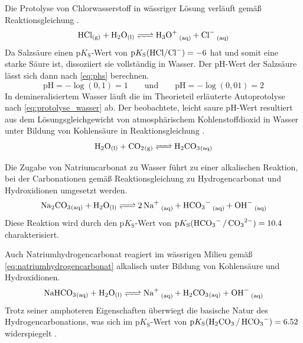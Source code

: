 Die Protolyse von Chlorwasserstoff in wässriger Lösung verläuft gemäß Reaktionsgleichung .
\begin{equation}
    \ce{HCl_{(g)} + H2O_{(l)} <=> H3O+ _{(aq)} + Cl- _{(aq)}}
    \label{eq:hcl_protolyse}
\end{equation}
Da Salzsäure einen  $\mathrm{p}K_{\mathrm{S}}$-Wert von $\mathrm{p}K_{\mathrm{S}}\mathrm{\ce{(HCl/Cl^-)}}=-6$ hat und somit eine starke Säure ist, dissoziiert sie vollständig in Wasser. Der $\text{pH}$-Wert der Salzsäure lässt sich dann nach \eqref{eq:phs} berechnen. \cite{pKs_Chemie}
\begin{equation}
    \mathrm{pH} = -\log(0{,}1) = 1
    \qquad \text{und} \qquad
    \mathrm{pH} = -\log(0{,}01) = 2
    \label{eq:hcl_pH}
\end{equation}
In demineralisiertem Wasser läuft die im Theorieteil erläuterte Autoprotolyse nach \eqref{eq:protolyse_wasser} ab. Der beobachtete, leicht saure pH-Wert resultiert aus dem Lösungsgleichgewicht von atmosphärischem Kohlenstoffdioxid in Wasser unter Bildung von Kohlensäure in Reaktionsgleichung .
\begin{equation}
    \ce{H2O_{(l)} + CO2_{(g)} <=> H2CO3_{(aq)}}
    \label{eq:co2_wasser}
\end{equation}

Die Zugabe von Natriumcarbonat zu Wasser führt zu einer alkalischen Reaktion, bei der Carbonationen gemäß Reaktionsgleichung  zu Hydrogencarbonat und Hydroxidionen umgesetzt werden.
\begin{equation}
    \ce{Na2CO3_{(aq)} + H2O_{(l)} <=> 2Na+ _{(aq)} + HCO3- _{(aq)} + OH- _{(aq)}}
    \label{eq:natriumcarbonat}
\end{equation}
Diese Reaktion wird durch den $\mathrm{p}K_{\mathrm{S}}$-Wert von $\mathrm{p}K_{\mathrm{S}}\ce{(HCO3- / CO3^2-)}=\SI{10.4}{}$ charakterisiert. \cite{pKs_Chemie}

Auch Natriumhydrogencarbonat reagiert im wässrigen Milieu gemäß \eqref{eq:natriumhydrogencarbonat} alkalisch unter Bildung von Kohlensäure und Hydroxidionen.
\begin{equation}
    \ce{NaHCO3_{(aq)} + H2O_{(l)} <=> Na+ _{(aq)} + H2CO3_{(aq)} + OH- _{(aq)}}
    \label{eq:natriumhydrogencarbonat}
\end{equation}
Trotz seiner amphoteren Eigenschaften überwiegt die basische Natur des Hydrogencarbonations, was sich im $\mathrm{p}K_{\mathrm{S}}$-Wert von $\mathrm{p}K_{\mathrm{S}}\ce{(H2CO3 / HCO3^-)}=\SI{6.52}{}$ widerspiegelt \cite{pKs_Chemie}.

